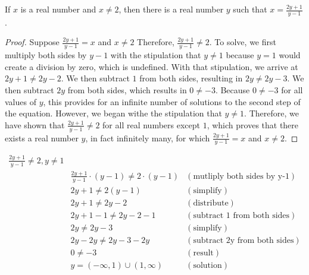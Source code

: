 
\begin{theorem}
  If $x$ is a real number and $x \ne 2$, then there is a real number $y$ such
  that $x = \frac{2y+1}{y-1}$.
\end{theorem}

\begin{proof}
  Suppose $\frac{2y+1}{y-1} = x$ and $x \ne 2$ Therefore, $\frac{2y+1}{y-1}
  \ne 2$. To solve, we first multiply both sides by $y-1$ with the stipulation
  that $y \ne 1$ because $y = 1$ would create a division by zero, which is
  undefined. With that stipulation, we arrive at $2y+1\ne 2y-2$. We then
  subtract $1$ from both sides, resulting in $2y \ne 2y-3$. We then subtract
  $2y$ from both sides, which results in $0 \ne -3$. Because $0 \ne -3$ for
  all values of $y$, this provides for an infinite number of solutions to the
  second step of the equation. However, we began withe the stipulation that $y
  \ne 1$. Therefore, we have shown that $\frac{2y+1}{y-1} \ne 2$ for all real
  numbers except $1$, which proves that there exists a real number $y$, in
  fact infinitely many, for which $\frac{2y+1}{y-1}=x$ and $x \ne 2$.
\end{proof}



\begin{align*}
  \frac{2y+1}{y-1} \ne 2, y \ne 1\\
        &\frac{2y+1}{y-1} \cdot (y-1) \ne 2 \cdot (y-1)&(\textrm{mutliply both sides by y-1})\\
        &2y+1 \ne 2(y-1) &(\textrm{simplify})\\
        &2y+1 \ne 2y-2 &(\textrm{distribute})\\
        &2y+1-1 \ne 2y-2-1 &(\textrm{subtract 1 from both sides})\\
        &2y \ne 2y-3 &(\textrm{simplify})\\
        &2y-2y \ne 2y-3-2y &(\textrm{subtract 2y from both sides})\\
        &0 \ne -3 &(\textrm{result})\\
        &y = (-\infty, 1)\cup(1,\infty) &(\textrm{solution})
\end{align*}
